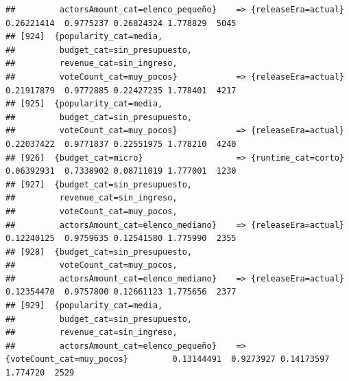 \documentclass[
]{article}
\begin{document}
\begin{verbatim}
##         actorsAmount_cat=elenco_pequeño}    => {releaseEra=actual}               0.26221414  0.9775237 0.26824324 1.778829  5045
## [924]  {popularity_cat=media,                                                                                                   
##         budget_cat=sin_presupuesto,                                                                                             
##         revenue_cat=sin_ingreso,                                                                                                
##         voteCount_cat=muy_pocos}            => {releaseEra=actual}               0.21917879  0.9772885 0.22427235 1.778401  4217
## [925]  {popularity_cat=media,                                                                                                   
##         budget_cat=sin_presupuesto,                                                                                             
##         voteCount_cat=muy_pocos}            => {releaseEra=actual}               0.22037422  0.9771837 0.22551975 1.778210  4240
## [926]  {budget_cat=micro}                   => {runtime_cat=corto}               0.06392931  0.7338902 0.08711019 1.777001  1230
## [927]  {budget_cat=sin_presupuesto,                                                                                             
##         revenue_cat=sin_ingreso,                                                                                                
##         voteCount_cat=muy_pocos,                                                                                                
##         actorsAmount_cat=elenco_mediano}    => {releaseEra=actual}               0.12240125  0.9759635 0.12541580 1.775990  2355
## [928]  {budget_cat=sin_presupuesto,                                                                                             
##         voteCount_cat=muy_pocos,                                                                                                
##         actorsAmount_cat=elenco_mediano}    => {releaseEra=actual}               0.12354470  0.9757800 0.12661123 1.775656  2377
## [929]  {popularity_cat=media,                                                                                                   
##         budget_cat=sin_presupuesto,                                                                                             
##         revenue_cat=sin_ingreso,                                                                                                
##         actorsAmount_cat=elenco_pequeño}    => {voteCount_cat=muy_pocos}         0.13144491  0.9273927 0.14173597 1.774720  2529

\end{verbatim}
\end{document}
